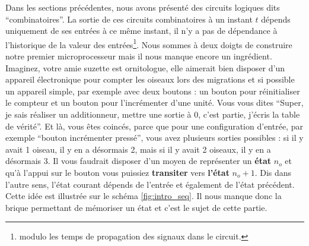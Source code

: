 Dans les sections précédentes, nous avons présenté des circuits logiques dits ``combinatoires''. La sortie de ces circuits combinatoires à un instant $t$ dépends uniquement de ses entrées à ce même instant, il n'y a pas de dépendance à l'historique de la valeur des entrées\footnote{modulo les temps de propagation des signaux dans le circuit.}. Nous sommes à deux doigts de construire notre premier microprocesseur mais il nous manque encore un ingrédient. Imaginez, votre amie suzette est ornitologue, elle aimerait bien disposer d'un appareil électronique pour compter les oiseaux lors des migrations et si possible un appareil simple, par exemple avec deux boutons : un bouton pour réinitialiser le compteur et un bouton pour l'incrémenter d'une unité. Vous vous dites ``Super, je sais réaliser un additionneur, mettre une sortie à 0, c'est partie, j'écris la table de vérité''. Et là, vous êtes coincés, parce que pour une configuration d'entrée, par exemple ``bouton incrémenter pressé'', vous avez plusieurs sorties possibles : si il y avait 1 oiseau, il y en a désormais 2, mais si il y avait 2 oiseaux, il y en a désormais 3. Il vous faudrait disposer d'un moyen de représenter un \textbf{état} $n_o$ et qu'à l'appui sur le bouton vous puissiez \textbf{transiter} vers \textbf{l'état} $n_o + 1$. Dis dans l'autre sens, l'état courant dépends de l'entrée et également de l'état précédent. Cette idée est illustrée sur le schéma \ref{fig:intro_seq}. Il nous manque donc la brique permettant de mémoriser un état et c'est le sujet de cette partie.


